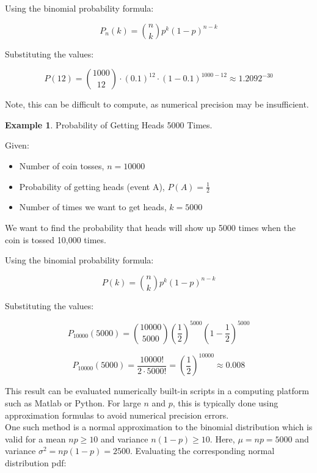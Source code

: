 \documentclass[12pt]{book}
\theoremstyle{definition}
\newtheorem{exmp}{Example}[chapter]
\begin{document}
Using the binomial probability formula:

\[
P_n(k) = \binom{n}{k} p^k (1 - p)^{n - k}
\]

Substituting the values:

\[
P(12) = \binom{1000}{12} \cdot (0.1)^{12} \cdot (1 - 0.1)^{1000 - 12} \approx 1.2092^{-30}
\]

Note, this can be difficult to compute, as numerical precision may be insufficient.



\begin{tcolorbox}
\begin{exmp}{Probability of Getting Heads 5000 Times.}


Given:

\begin{itemize}
    \item Number of coin tosses, $n = 10000$
    \item Probability of getting heads (event A), $P(A) = \frac{1}{2}$
    \item Number of times we want to get heads, $k = 5000$
\end{itemize}


We want to find the probability that heads will show up 5000 times when the coin is tossed 10,000 times. 

\end{exmp}
\end{tcolorbox}

Using the binomial probability formula:

\[
P(k) = \binom{n}{k} p^k (1 - p)^{n - k}
\]

Substituting the values:

\[
P_{10000}(5000) = \binom{10000}{5000} \left(\frac{1}{2}\right)^{5000} \left(1 - \frac{1}{2}\right)^{5000}
\]

\[
P_{10000}(5000) = \frac{10000!}{2 \cdot 5000!} = \left(\frac{1}{2}\right)^{10000} \approx 0.008
\]

This result can be evaluated numerically built-in scripts in a computing platform such as Matlab or Python. For large \(n\) and \(p\), this is typically done using approximation formulas to avoid numerical precision errors. \\


One such method is a normal approximation to the binomial distribution which is valid for a mean $np \geq 10$ and variance $n(1-p) \geq 10$. Here, $\mu=np=5000$ and variance $\sigma^2=np(1-p)=2500$. Evaluating the corresponding normal distribution pdf:
\end{document}
